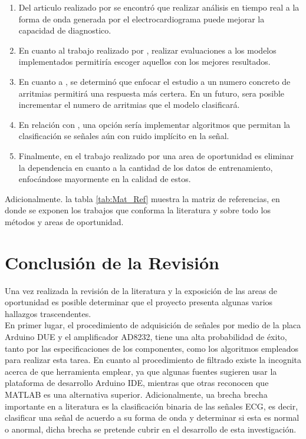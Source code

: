 \begin{enumerate}
    \item Del articulo realizado por \citep{bib9} se encontró que realizar análisis en tiempo real a la forma de onda generada por el electrocardiograma puede mejorar la capacidad de diagnostico.
    \item En cuanto al trabajo realizado por \citep{bib10}, realizar evaluaciones a los modelos implementados permitiría escoger aquellos con los mejores resultados.
    \item En cuanto a \citep{bib11}, se determinó que enfocar el estudio a un numero concreto de arritmias permitirá una respuesta más certera. En un futuro, sera posible incrementar el numero de arritmias que el modelo clasificará.
    \item En relación con \citep{bib12}, una opción sería implementar algoritmos que permitan la clasificación se señales aún con ruido implícito en la señal.
    \item Finalmente, en el trabajo realizado por \citep{bib4} una area de oportunidad es eliminar la dependencia en cuanto a la cantidad de los datos de entrenamiento, enfocándose mayormente en la calidad de estos. 
\end{enumerate}

Adicionalmente. la tabla \ref{tab:Mat_Ref} muestra la matriz de referencias, en donde se exponen los trabajos que conforma la literatura y sobre todo los métodos y areas de oportunidad.



\section{Conclusión de la Revisión}
Una vez realizada la revisión de la literatura y la exposición de las areas de oportunidad es posible determinar que el proyecto presenta algunas varios hallazgos trascendentes.\\
En primer lugar, el procedimiento de adquisición de señales por medio de la placa Arduino DUE y el amplificador AD8232, tiene una alta probabilidad de éxito, tanto por las especificaciones de los componentes, como los algoritmos empleados para realizar esta tarea. En cuanto al procedimiento de filtrado existe la incognita acerca de que herramienta emplear, ya que algunas fuentes sugieren usar la plataforma de desarrollo Arduino IDE, mientras que otras reconocen que MATLAB es una alternativa superior.
Adicionalmente, ua brecha brecha importante en a literatura es la clasificación binaria de las señales ECG, es decir, clasificar una señal de acuerdo a su forma de onda y determinar si esta es normal o anormal, dicha brecha se pretende cubrir en el desarrollo de esta investigación.

